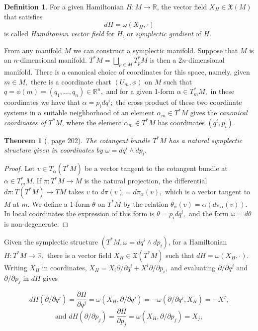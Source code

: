 \documentclass[12pt, letterpaper, reqno]{amsart}
\theoremstyle{definition}
\newtheorem{df}{Definition}
\theoremstyle{plain}
\newtheorem{thm}{Theorem}
\theoremstyle{remark}
\providecommand{\DIFdelbegin}{} %
\newcommand{\DIFscaledelfig}{0.5}
\newlength{\DIFdelgraphicswidth} %
\newlength{\DIFdelgraphicsheight} %
\newcommand{\DIFdelincludegraphics}[2][]{%
\sbox{\DIFdelgraphicsbox}{\DIFOincludegraphics[#1]{#2}}%
\settoboxwidth{\DIFdelgraphicswidth}{\DIFdelgraphicsbox} %
\settoboxtotalheight{\DIFdelgraphicsheight}{\DIFdelgraphicsbox} %
\scalebox{\DIFscaledelfig}{%
\parbox[b]{\DIFdelgraphicswidth}{\usebox{\DIFdelgraphicsbox}\\[-\baselineskip] \rule{\DIFdelgraphicswidth}{0em}}\llap{\resizebox{\DIFdelgraphicswidth}{\DIFdelgraphicsheight}{%
\setlength{\unitlength}{\DIFdelgraphicswidth}%
\begin{picture}(1,1)%
\thicklines\linethickness{2pt} %
{\color[rgb]{1,0,0}\put(0,0){\framebox(1,1){}}}%
{\color[rgb]{1,0,0}\put(0,0){\line( 1,1){1}}}%
{\color[rgb]{1,0,0}\put(0,1){\line(1,-1){1}}}%
\end{picture}%
}\hspace*{3pt}}} %
} %
\DeclareRobustCommand{\DIFdelbegin}{\DIFOdelbegin \let\includegraphics\DIFdelincludegraphics} %
\begin{document}
\begin{df}
	For a given Hamiltonian $ H: M \rightarrow \mathbb{R} $, the vector field $ X_H\in \mathfrak{X}(M) $ that satisfies $$ dH = \omega(X_H, \cdot) $$ is called \textit{Hamiltonian vector field} for $ H $, or \textit{symplectic gradient} of $ H. $ 
\end{df}

From any manifold $ M $ we can construct a symplectic manifold. Suppose that $ M $ is an $ n$-dimensional manifold. $ T^*M= \bigsqcup_{p\in M} T^*_p M$ is then a $ 2n $-dimensional manifold. There is a canonical choice of coordinates for this space, namely, given $ m\in M, $ there is a coordinate chart $ (U_m,\phi) $ on $ M $ such that $ q=\phi(m)=(q_1,\dots,q_n)\in \mathbb{R}^n, $ and for a given 1-form $ \alpha\in T_m^*M,$ in these coordinates we have that $ \alpha=p_i dq^i; $ the cross product of these two coordinate systems in a suitable neighborhood of an element $ \alpha_m\in T^*M $ gives the \textit{canonical coordinates of $ T^*M $}, where the element $ \alpha_m\in T^*M $ has coordinates $ (q^i,p_i) $.

\begin{thm}[\cite{arnol2013mathematical}, page 202]
	The cotangent bundle $ T^*M $ has a natural symplectic structure given in coordinates by $\omega = dq^i\wedge dp_i.$
\end{thm}

\begin{proof}
	Let $ v\in T_\alpha \left( T^*M \right)  $ be a vector tangent to the cotangent bundle at $ \alpha\in T^*_m M. $ If $ \pi:T^*M \rightarrow M $ is the natural projection, the differential $ d\pi : T \left( T^*M \right) \rightarrow TM $ takes $ v $ to $ d\pi(v)=d\pi_\alpha(v), $ which is a vector tangent to $ M $ at $ m. $ We define a 1-form $ \theta $ on $ T^*M $ by the relation $ \theta_\alpha(v)=\alpha(d\pi_\alpha(v)). $ In local coordinates the expression of this form is $ \theta= p_i dq^i, $ and the form $ \omega = d\theta $ is non-degenerate. 
\end{proof}

Given the symplectic structure $ (T^*M, \omega = dq^i\wedge dp_i) $, for a Hamiltonian $ H: T^*M \rightarrow \mathbb{R}, $ there is a vector field $ X_H \in \mathfrak{X}(T^*M) $ such that $ dH = \omega (X_H,\cdot) $. Writing $ X_H $ in coordinates, $ X_H = X_i \partial/\partial q^i + X^i \partial/\partial p_i, $ and evaluating $ \partial/\partial q^j $ and $ \partial/\partial p_j $ in $ dH $ gives  

$$ dH(\partial/\partial q^j) = \frac{\partial H}{\partial q^j} = \omega(X_H, \partial/\partial q^j) = -\omega(\partial/\partial q^j, X_H) = -X^j,$$ 
$$\text{and } dH(\partial/\partial p_j) = \frac{\partial H}{\partial p_j} =\omega(X_H, \partial/\partial p_j)=X_j, $$ 
\DIFdelbegin %
\end{document}
